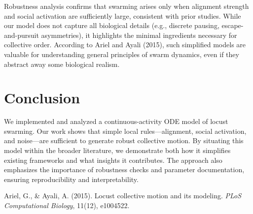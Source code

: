 \documentclass[11pt,a4paper]{article}
\begin{document}
Robustness analysis confirms that swarming arises only when alignment strength and social activation are sufficiently large, consistent with prior studies. While our model does not capture all biological details (e.g., discrete pausing, escape-and-pursuit asymmetries), it highlights the minimal ingredients necessary for collective order. According to Ariel and Ayali (2015), such simplified models are valuable for understanding general principles of swarm dynamics, even if they abstract away some biological realism.

\section{Conclusion}

We implemented and analyzed a continuous-activity ODE model of locust swarming. Our work shows that simple local rules—alignment, social activation, and noise—are sufficient to generate robust collective motion. By situating this model within the broader literature, we demonstrate both how it simplifies existing frameworks and what insights it contributes. The approach also emphasizes the importance of robustness checks and parameter documentation, ensuring reproducibility and interpretability.

\begin{thebibliography}{9}
Ariel, G., \& Ayali, A. (2015). Locust collective motion and its modeling. \emph{PLoS Computational Biology}, 11(12), e1004522.
\end{thebibliography}
\end{document}
